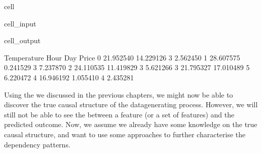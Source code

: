 \documentclass[letterpaper,10pt,english]{jupyterBook}
\begin{document}
\begin{sphinxuseclass}{cell}
\begin{sphinxVerbatimInput}
\begin{sphinxuseclass}{cell_input}
\begin{sphinxVerbatim}[commandchars=\\\{\}]
  
     
     
     
     

\end{sphinxVerbatim}

\end{sphinxuseclass}\end{sphinxVerbatimInput}
\begin{sphinxVerbatimOutput}

\begin{sphinxuseclass}{cell_output}
\begin{sphinxVerbatim}[commandchars=\\\{\}]
   Temperature       Hour  Day     Price
0    21.952540  14.229126    3 \PYGZhy{}2.562450
1    28.607575   0.241529    3  7.237870
2    24.110535  11.419829    3  5.621266
3    21.795327  17.010489    5  6.220472
4    16.946192   1.055410    4 \PYGZhy{}2.435281
\end{sphinxVerbatim}

\end{sphinxuseclass}\end{sphinxVerbatimOutput}

\end{sphinxuseclass}
\sphinxAtStartPar
Using the  we discussed in the previous chapters, we might now be able to discover the true causal structure of the data\sphinxhyphen{}generating process. However, we will still not be able to see the  between a feature (or a set of features) and the predicted outcome. Now, we assume we already have some knowledge on the true causal structure, and want to use some approaches to further characterise the dependency patterns.
\end{document}
